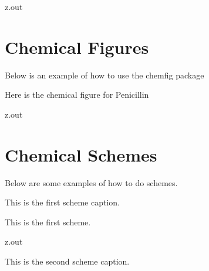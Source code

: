 \MyIO


\begin{VerbatimOut}{z.out}


\section{Chemical Figures}

Below is an example of how to use the chemfig package
\cite{tellechea2021}

Here is the chemical figure
for Penicillin
\cite[pages~72--73]{tellechea2021}\\

\end{VerbatimOut}

\MyIO


\begin{VerbatimOut}{z.out}
\newpage
\section{Chemical Schemes}

Below are some examples of how to do schemes.

\begin{scheme}[ht]
  \caption{This is the first scheme caption.}
  \vspace*{6pt}
  \begin{center}
    This is the first scheme.
  \end{center}
\end{scheme}
\end{VerbatimOut}

\MyIO


\begin{VerbatimOut}{z.out}
\begin{scheme}[ht]
  \caption{This is the second scheme caption.}
  \vspace*{6pt}
  \begin{center}
    \scriptsize{}
    \schemestart
      \arrow
    \schemestop
  \end{center}
\end{scheme}
\end{VerbatimOut}

